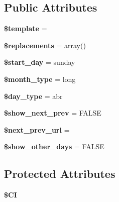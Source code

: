 \subsection*{Public Attributes}
\begin{DoxyCompactItemize}
\item 
\mbox{\label{class_c_i___calendar_a7121101cc88b0259092d34db08743787}} 
{\bfseries \$template} = \textquotesingle{}\textquotesingle{}
\item 
\mbox{\label{class_c_i___calendar_a9f7ec1a4b8ac75dd1c074b032b9e4b8f}} 
{\bfseries \$replacements} = array()
\item 
\mbox{\label{class_c_i___calendar_a8e219d6b83afbfc84e11d1be4323b3c3}} 
{\bfseries \$start\+\_\+day} = \textquotesingle{}sunday\textquotesingle{}
\item 
\mbox{\label{class_c_i___calendar_a81cad8588bf3f70efb546597e55024ac}} 
{\bfseries \$month\+\_\+type} = \textquotesingle{}long\textquotesingle{}
\item 
\mbox{\label{class_c_i___calendar_a27557cfd215775b9c41dae785680919b}} 
{\bfseries \$day\+\_\+type} = \textquotesingle{}abr\textquotesingle{}
\item 
\mbox{\label{class_c_i___calendar_ab680fce4a63c66e5efefebea5502c2b0}} 
{\bfseries \$show\+\_\+next\+\_\+prev} = F\+A\+L\+SE
\item 
\mbox{\label{class_c_i___calendar_af5ef1b222707555bd6162f9727707766}} 
{\bfseries \$next\+\_\+prev\+\_\+url} = \textquotesingle{}\textquotesingle{}
\item 
\mbox{\label{class_c_i___calendar_a7fe5ce60d0125cc39763840df06b2563}} 
{\bfseries \$show\+\_\+other\+\_\+days} = F\+A\+L\+SE
\end{DoxyCompactItemize}
\subsection*{Protected Attributes}
\begin{DoxyCompactItemize}
\item 
\mbox{\label{class_c_i___calendar_a5ffc259e818058a3b91ecc754fc384b3}} 
{\bfseries \$\+CI}
\end{DoxyCompactItemize}


